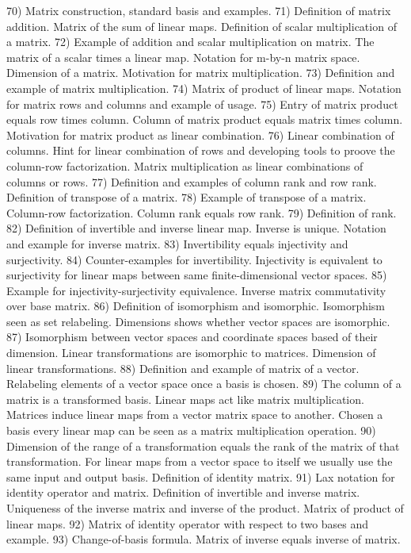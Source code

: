 \begin{multicols}{3}
  70) Matrix construction, standard basis and examples.
  71) Definition of matrix addition. Matrix of the sum of linear maps.
  Definition of scalar multiplication of a matrix.
  72) Example of addition and scalar multiplication on matrix. The matrix of a
  scalar times a linear map. Notation for m-by-n matrix space. Dimension of a
  matrix. Motivation for matrix multiplication.
  73) Definition and example of matrix multiplication.
  74) Matrix of product of linear maps. Notation for matrix rows and columns
  and example of usage.
  75) Entry of matrix product equals row times column. Column of matrix product
  equals matrix times column. Motivation for matrix product as linear
  combination.
  76) Linear combination of columns. Hint for linear combination of rows and
  developing tools to proove the column-row factorization. Matrix
  multiplication as linear combinations of columns or rows.
  77) Definition and examples of column rank and row rank. Definition of
  transpose of a matrix.
  78) Example of transpose of a matrix. Column-row factorization. Column rank
  equals row rank.
  79) Definition of rank.
  82) Definition of invertible and inverse linear map. Inverse is unique.
  Notation and example for inverse matrix.
  83) Invertibility equals injectivity and surjectivity.
  84) Counter-examples for invertibility. Injectivity is equivalent to
  surjectivity for linear maps between same finite-dimensional vector spaces.
  85) Example for injectivity-surjectivity equivalence. Inverse matrix
  commutativity over base matrix.
  86) Definition of isomorphism and isomorphic. Isomorphism seen as set
  relabeling. Dimensions shows whether vector spaces are isomorphic.
  87) Isomorphism between vector spaces and coordinate spaces based of their
  dimension. Linear transformations are isomorphic to matrices. Dimension of
  linear transformations.
  88) Definition and example of matrix of a vector. Relabeling elements of a
  vector space once a basis is chosen.
  89) The column of a matrix is a transformed basis. Linear maps act like
  matrix multiplication. Matrices induce linear maps from a vector matrix space
  to another. Chosen a basis every linear map can be seen as a matrix
  multiplication operation.
  90) Dimension of the range of a transformation equals the rank of the matrix
  of that transformation. For linear maps from a vector space to itself we
  usually use the same input and output basis. Definition of identity matrix.
  91) Lax notation for identity operator and matrix. Definition of invertible
  and inverse matrix. Uniqueness of the inverse matrix and inverse of the
  product. Matrix of product of linear maps.
  92) Matrix of identity operator with respect to two bases and example.
  93) Change-of-basis formula. Matrix of inverse equals inverse of matrix.
\end{multicols}

